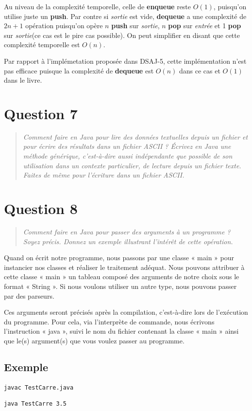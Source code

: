 \documentclass[11pt,a4paper]{article}
\begin{document}
Au niveau de la complexité temporelle, celle de \textbf{enqueue} reste $O(1)$, puisqu'on utilise juste un \textbf{push}. Par contre si \textit{sortie} est vide, \textbf{dequeue} a une complexité de $2n+1$ opération puisqu'on opère $n$ \textbf{push} sur \textit{sortie}, $n$ \textbf{pop} sur \textit{entrée} et 1 \textbf{pop} sur \textit{sortie}(ce cas est le pire cas possible). On peut simplifier en disant que cette complexité temporelle est $O(n)$.

Par rapport à l'implémetation proposée dans DSAJ-5, cette implémentation n'est pas efficace puisque la complexité de \textbf{dequeue} est $O(n)$ dans ce cas et $O(1)$ dans le livre.

\section{Question 7}
\begin{quotation}
\textit{Comment faire en Java pour lire des données textuelles depuis un fichier et pour
écrire des résultats dans un fichier ASCII ? Écrivez en Java une méthode générique,
c’est-à-dire aussi indépendante que possible de son utilisation dans un contexte
particulier, de lecture depuis un fichier texte. Faites de même pour l’écriture dans
un fichier ASCII.}
\end{quotation}


\section{Question 8}
\begin{quotation}
\textit{Comment faire en Java pour passer des arguments à un programme ? Soyez précis.
Donnez un exemple illustrant l’intérêt de cette opération.}
\end{quotation}
Quand on écrit notre programme, nous passons par une classe « main » pour instancier nos classes et réaliser le traitement adéquat. Nous pouvons attribuer à cette classe « main » un tableau composé des arguments de notre choix sous le format « String ». Si nous voulons utiliser un autre type, nous pouvons passer par des parseurs.

Ces arguments seront précisés après la compilation, c’est-à-dire lors de l’exécution du programme. Pour cela, via l’interprète de commande, nous écrivons l’instruction « java », suivi le nom du fichier contenant la classe « main » ainsi que le(s) argument(s) que vous voulez passer au programme.
\subsection*{Exemple}


\begin{lstlisting}[caption=Compilation]
javac TestCarre.java
\end{lstlisting}
\begin{lstlisting}[caption=Exécution (3.5 correspond à l’argument que l’on passe au programme)]
java TestCarre 3.5
\end{lstlisting}
\end{document}
